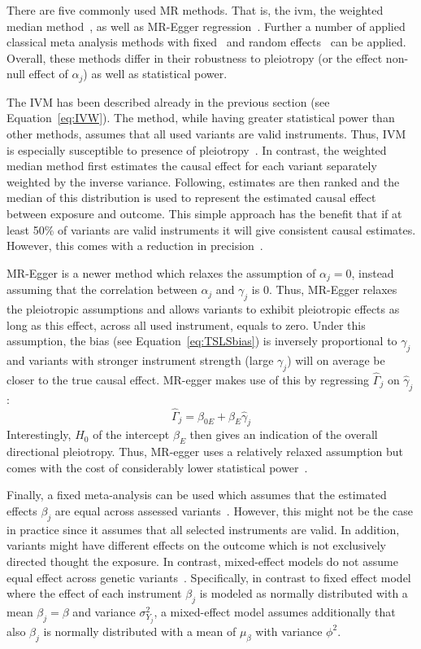 There are five commonly used MR methods.
That is, the \acrfull{ivm}, the weighted median method~\cite{Bowden2016}, as well as MR-Egger regression~\cite{Bowden2015}.
Further a number of applied classical meta analysis methods with fixed~\cite{Nelson2015a} and random effects~\cite{Ahmad2015a} can be applied.
Overall, these methods differ in their robustness to pleiotropy (or the effect non-null effect of $\alpha_j$) as well as statistical power.

The IVM has been described already in the previous section (see Equation~\ref{eq:IVW}).
The method, while having greater statistical power than other methods, assumes that all used variants are valid instruments.
Thus, IVM is especially susceptible to presence of pleiotropy~\cite{Burgess2015b}.
In contrast, the weighted median method first estimates the causal effect for each variant separately weighted by the inverse variance. 
Following, estimates are then ranked and the median of this distribution is used to represent the estimated causal effect between exposure and outcome.
This simple approach has the benefit that if at least 50\% of variants are valid instruments it will give consistent causal estimates.
However, this comes with a reduction in precision~\cite{Bowden2015}.

MR-Egger is a newer method which relaxes the assumption of $\alpha_j=0$, instead  assuming that the correlation between $\alpha_j$ and $\gamma_j$ is $0$.
Thus, MR-Egger relaxes the pleiotropic assumptions and allows variants to exhibit pleiotropic effects as long as this effect, across all used instrument, equals to zero.
Under this assumption, the bias (see Equation~\ref{eq:TSLSbias}) is inversely proportional to $\gamma_j$ and variants with stronger instrument strength (large $\gamma_j$) will on average be closer to the true causal effect.
MR-egger makes use of this by regressing $\hat{\Gamma}_j$ on $\hat{\gamma}_j$:
\begin{equation}\label{eq:egger}
  \hat{\Gamma}_j = \beta_{0E} + \beta_{E} \hat{\gamma}_j
\end{equation}
Interestingly, $H_0$ of the intercept $\beta_E$ then gives an indication of the overall directional pleiotropy.
Thus, MR-egger uses a relatively relaxed assumption but comes with the cost of  considerably lower statistical power~\cite{Bowden2015}.

Finally, a fixed meta-analysis can be used which assumes that the estimated effects $\beta_j$ are equal across assessed variants~\cite{Burgess2015b}.
However, this might not be the case in practice since it assumes that all selected instruments are valid.
In addition, variants might have different effects on the outcome which is not exclusively directed thought the exposure. 
In contrast, mixed-effect models do not assume equal effect across genetic variants~\cite{Burgess2015b}.
Specifically, in contrast to fixed effect model where the effect of each instrument $\beta_j$ is modeled as normally distributed with a  mean $\beta_j = \beta$ and variance $\sigma_{Y_j}^2$, a mixed-effect model assumes additionally that also $\beta_j$ is normally distributed with a mean of $\mu_\beta$ with variance $\phi^2$.

